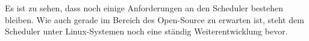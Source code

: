 \documentclass[ngerman]{seminarvorlage}
\begin{document}
Es ist zu sehen, dass noch einige Anforderungen an den Scheduler bestehen bleiben.
Wie auch gerade im Bereich des Open-Source zu erwarten ist, steht dem Scheduler unter Linux-Systemen noch eine ständig Weiterentwicklung bevor.  


\pagebreak

%
%


\end{document}
